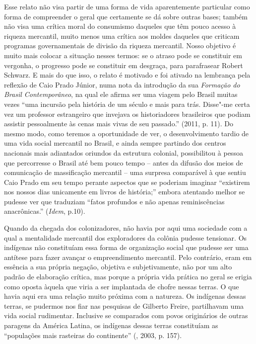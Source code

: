 Esse relato não visa partir de uma forma de vida aparentemente
particular como forma de compreender o geral que certamente se dá sobre
outras bases; também não visa uma crítica moral do consumismo daqueles
que têm pouco acesso à riqueza mercantil, muito menos uma crítica aos
moldes daqueles que criticam programas governamentais de divisão da
riqueza mercantil. Nosso objetivo é muito mais colocar a situação nesses
termos: se o atraso pode se constituir em vergonha, o progresso pode se
constituir em desgraça, para parafrasear Robert Schwarz. E mais do que
isso, o relato é motivado e foi ativado na lembrança pela reflexão de
Caio Prado Júnior, numa nota da introdução da sua \emph{Formação do
Brasil Contemporâneo}, na qual ele afirma ser uma viagem pelo Brasil
muitas vezes ``uma incursão pela história de um século e mais para trás.
Disse"-me certa vez um professor estrangeiro que invejava os
historiadores brasileiros que podiam assistir pessoalmente às cenas mais
vivas de seu passado.'' (2011, p. 11). Do mesmo modo, como teremos a
oportunidade de ver, o desenvolvimento tardio de uma vida social
mercantil no Brasil, e ainda sempre partindo dos centros nacionais mais
adiantados oriundos da estrutura colonial, possibilitou à pessoa que
percorresse o Brasil até bem pouco tempo -- antes da difusão dos meios
de comunicação de massificação mercantil -- uma surpresa comparável à
que sentiu Caio Prado em seu tempo perante aspectos que se poderiam
imaginar ``existirem nos nossos dias unicamente em livros de história;''
embora atentando melhor se pudesse ver que traduziam ``fatos profundos e
não apenas reminiscências anacrônicas.'' (\emph{Idem}, p.10).

Quando da
chegada dos colonizadores, não havia por aqui uma sociedade com a qual a
mentalidade mercantil dos exploradores da colônia pudesse tensionar. Os
indígenas não constituíam essa forma de organização social que pudesse
ser uma antítese para fazer avançar o empreendimento mercantil. Pelo
contrário, eram em essência a sua própria negação, objetiva e
subjetivamente, não por um alto padrão de elaboração crítica, mas porque
a própria vida prática no geral se erigia como oposta àquela que viria a ser implantada
de chofre nessas terras. O que havia aqui era uma relação muito próxima
com a natureza. Os indígenas dessas terras, se pudermos nos fiar nas pesquisas de
Gilberto Freire, partilhavam uma vida social rudimentar. Inclusive se
comparados com povos originários de outras paragens da América Latina,
os indígenas dessas terras constituíam as ``populações mais rasteiras do
continente'' (, 2003, p. 157).

